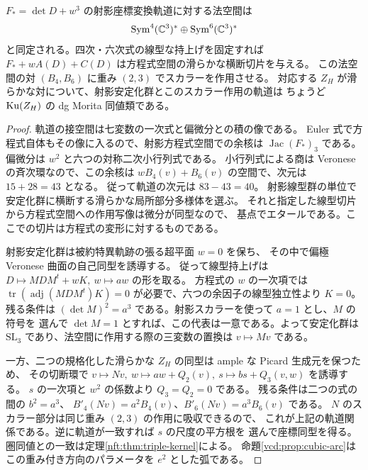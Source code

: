 \begin{proposition}[退化三次の横断切片と重み付き方向]\label{vcd:prop:normal-slice}
$F_*=\det D+w^3$ の射影座標変換軌道に対する法空間は
\[
  \operatorname{Sym}^4(\mathbb C^3)^*\oplus\operatorname{Sym}^6(\mathbb C^3)^*
\]
と同定される。四次・六次式の線型な持上げを固定すれば
$F_*+wA(D)+C(D)$ は方程式空間の滑らかな横断切片を与える。
この法空間の対 $(B_4,B_6)$ に重み $(2,3)$ でスカラーを作用させる。
対応する $Z_H$ が滑らかな対について、射影安定化群とこのスカラー作用の軌道は
ちょうど $\operatorname{Ku}(Z_H)$ の dg Morita 同値類である。
\end{proposition}
\begin{proof}
軌道の接空間は七変数の一次式と偏微分との積の像である。
Euler 式で方程式自体もその像に入るので、射影方程式空間での余核は
$\operatorname{Jac}(F_*)_3$ である。偏微分は $w^2$ と六つの対称二次小行列式である。
小行列式による商は Veronese の斉次環なので、この余核は
$w B_4(v)+B_6(v)$ の空間で、次元は $15+28=43$ となる。
従って軌道の次元は $83-43=40$。
射影線型群の単位で安定化群に横断する滑らかな局所部分多様体を選ぶ。
それと指定した線型切片から方程式空間への作用写像は微分が同型なので、
基点でエタールである。ここでの切片は方程式の変形に対するものである。

射影安定化群は被約特異軌跡の張る超平面 $w=0$ を保ち、
その中で偏極 Veronese 曲面の自己同型を誘導する。
従って線型持上げは $D\mapsto MDM^t+wK,\ w\mapsto aw$ の形を取る。
方程式の $w$ の一次項では $\operatorname{tr}(\operatorname{adj}(MDM^t)K)=0$
が必要で、六つの余因子の線型独立性より $K=0$。残る条件は
$(\det M)^2=a^3$ である。射影スカラーを使って $a=1$ とし、$M$ の符号を
選んで $\det M=1$ とすれば、この代表は一意である。よって安定化群は
$\mathrm{SL}_3$ であり、法空間に作用する際の三変数の置換は $v\mapsto Mv$ である。

一方、二つの規格化した滑らかな $Z_H$ の同型は ample な Picard 生成元を保つため、
その切断環で $v\mapsto Nv,\ w\mapsto aw+Q_2(v),\ s\mapsto bs+Q_3(v,w)$ を誘導する。
$s$ の一次項と $w^2$ の係数より $Q_3=Q_2=0$ である。
残る条件は二つの式の間の $b^2=a^3$、
$B'_4(Nv)=a^2 B_4(v)$、$B'_6(Nv)=a^3B_6(v)$ である。
$N$ のスカラー部分は同じ重み $(2,3)$ の作用に吸収できるので、
これが上記の軌道関係である。逆に軌道が一致すれば $s$ の尺度の平方根を
選んで座標同型を得る。圏同値との一致は定理\ref{nft:thm:triple-kernel}による。
命題\ref{vcd:prop:cubic-arc}はこの重み付き方向のパラメータを $e^2$ とした弧である。
\end{proof}

